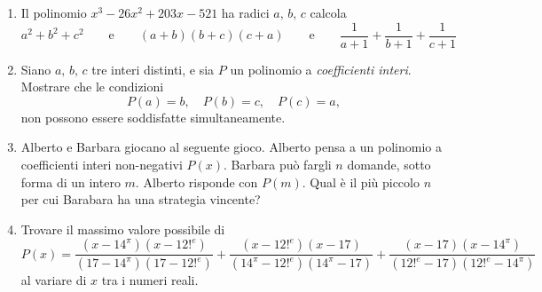 \documentclass[a4paper]{article}
\theoremstyle{remark}
\theoremstyle{definition}
\begin{document}
\begin{enumerate}
	\item  Il polinomio $ x^3 -26x^2 + 203x - 521 $ ha radici $a,\, b,\, c$ calcola 
	\[ a^2 + b^2 + c^2 \qquad\text{e}\qquad (a+b)(b+c)(c+a) \qquad\text{e}\qquad \frac{1}{a+1}+\frac{1}{b+1}+\frac{1}{c+1}\]
	
	\item Siano $ a,\, b,\, c $ tre interi distinti, e sia $ P $ un polinomio a \emph{coefficienti interi}. Mostrare che le condizioni $$  P(a) = b,\quad P(b) = c,\quad P(c) = a,  $$ non possono essere soddisfatte simultaneamente.

	\item Alberto e Barbara giocano al seguente gioco. Alberto pensa a un polinomio a coefficienti interi non-negativi $ P(x) $. Barbara può fargli $ n $ domande, sotto forma di un intero $ m $. Alberto risponde con $ P(m) $. Qual è il più piccolo $ n $ per cui Barabara ha una strategia vincente?
	
	\item  Trovare il massimo valore possibile di
	\[ P(x) = \frac{(x-14^\pi)(x-12!^e)}{(17-14^\pi)(17-12!^e)} 
	+\frac{(x-12!^e)(x-17)}{(14^\pi-12!^e)(14^\pi-17)} +\frac{(x-17)(x-14^\pi)}{(12!^e-17)(12!^e-14^\pi)} \]
	al variare di $ x $ tra i numeri reali.
	
\end{enumerate}
\end{document}
